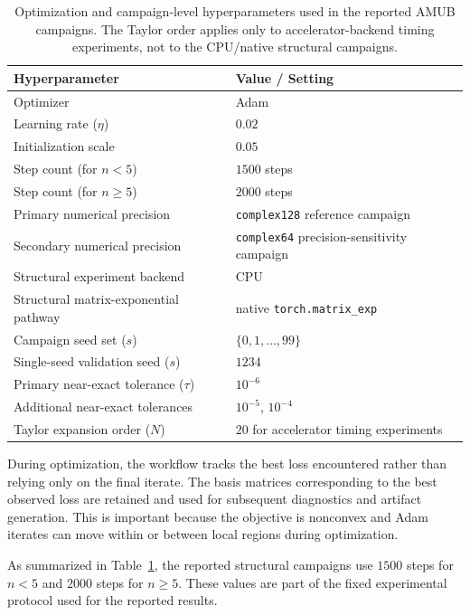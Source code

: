 \documentclass[a4paper,twocolumn,11pt,amsfonts,amssymb]{quantumarticle}
\begin{document}
\begin{table}[t]
  \caption{Optimization and campaign-level hyperparameters used in the reported AMUB campaigns. The Taylor order applies only to accelerator-backend timing experiments, not to the CPU/native structural campaigns.}
  \label{tab:hyperparameters}
  \begin{tabular}{ll}
    \toprule
    Hyperparameter & Value / Setting \\
    \midrule
    Optimizer & Adam \\
    Learning rate (\(\eta\)) & \(0.02\) \\
    Initialization scale & \(0.05\) \\
    Step count (for \(n < 5\)) & \(1500\) steps \\
    Step count (for \(n \ge 5\)) & \(2000\) steps \\
    Primary numerical precision & \texttt{complex128} reference campaign \\
    Secondary numerical precision & \texttt{complex64} precision-sensitivity campaign \\
    Structural experiment backend & CPU \\
    Structural matrix-exponential pathway & native \texttt{torch.matrix\_exp} \\
    Campaign seed set (\(s\)) & \(\{0,1,\ldots,99\}\) \\
    Single-seed validation seed (\(s\)) & \(1234\) \\
    Primary near-exact tolerance (\(\tau\)) & \(10^{-6}\) \\
    Additional near-exact tolerances & \(10^{-5}\), \(10^{-4}\) \\
    Taylor expansion order (\(N\)) & \(20\) for accelerator timing experiments \\
    \bottomrule
  \end{tabular}
\end{table}

During optimization, the workflow tracks the best loss encountered rather than relying only on the final iterate. The basis matrices corresponding to the best observed loss are retained and used for subsequent diagnostics and artifact generation. This is important because the objective is nonconvex and Adam iterates can move within or between local regions during optimization.

As summarized in Table~\ref{tab:hyperparameters}, the reported structural campaigns use \(1500\) steps for \(n<5\) and \(2000\) steps for \(n\geq 5\). These values are part of the fixed experimental protocol used for the reported results.
\end{document}
